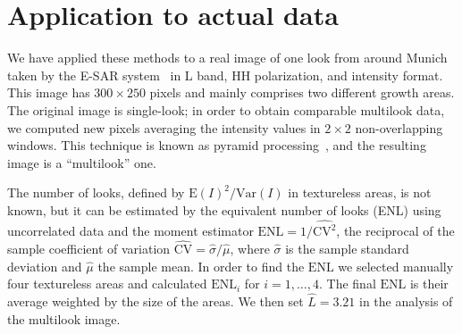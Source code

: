 \documentclass[twocolumn]{svjour3}
\begin{document}

\section{Application to actual data}
\label{application}

We have applied these methods to a real image of one look from around Munich taken by the E-SAR system~\cite{Horn1996} in L band, HH polarization, and intensity format. 
This image has $300\times250$ pixels and mainly comprises two different growth areas. 
The original image is single-look; in order to obtain comparable multilook data, we computed new pixels averaging the intensity values in $2\times2$ non-overlapping windows. This technique is known as pyramid processing~\cite{Adelson1984}, and the resulting image is a ``multilook'' one.

The number of looks, defined by ${\text{E}(I)^2}/{\text{Var}(I)}$ in textureless areas, is not known, but it can be estimated by the equivalent number of looks (ENL) using uncorrelated data and the moment estimator
$\text{ENL}={1}/{\widehat{\text{CV}^2}}$, the reciprocal of the sample coefficient of variation $\widehat{\text{CV}}={\widehat{\sigma}}/{\widehat\mu}$, where $\widehat{\sigma}$ is the sample standard deviation and $\widehat\mu$ the sample mean.
In order to find the $\text{ENL}$ we selected manually four textureless areas and calculated $\text{ENL}_i$ for $i=1, \ldots, 4$. 
The final $\text{ENL}$ is their average weighted by the size of the areas. 
We then set $\widehat L=3.21$ in the analysis of the multilook image.
\end{document}
